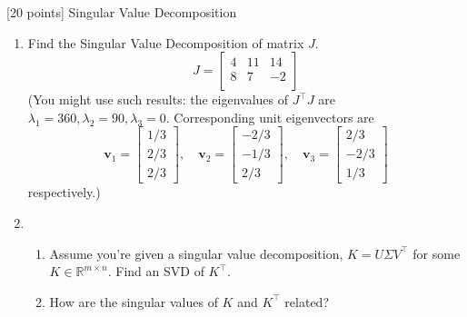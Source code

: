 [20 points] Singular Value Decomposition\\

\vspace{0.1in}

\begin{enumerate}
    \item Find the Singular Value Decomposition of matrix $J$.
    \[J = \begin{bmatrix}
    4 & 11 & 14\\
    8 & 7 & -2\\
    \end{bmatrix}\]
    (You might use such results: the eigenvalues of $J^\top J$ are $\lambda_1=360,\lambda_2=90,\lambda_3=0$. Corresponding unit eigenvectors are
    $$
    \left.\mathbf{v}_{1}=\left[\begin{array}{r}1/3\\2/3\\2/3\end{array}\right.\right],\quad\mathbf{v}_{2}=\left[\begin{array}{r}-2/3\\-1/3\\2/3\end{array}\right],\quad\mathbf{v}_{3}=\left[\begin{array}{r}2/3\\-2/3\\1/3\end{array}\right]
    $$
    respectively.)
    \item 
    \begin{enumerate}
        \item Assume you're given a singular value decomposition, $K=U\Sigma V^\top$ for some $K \in \mathbb{R}^{m\times n}$. Find an SVD of $K^\top$. 
        \item How are the singular values of $K$ and $K^\top$ related?
    \end{enumerate}
\end{enumerate}